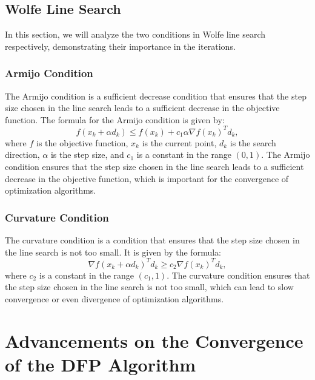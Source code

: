\documentclass[12pt,a4paper,draft]{beamer}  %
\theoremstyle{definition}
\numberwithin{equation}{section}
\begin{document}
\subsection{Wolfe Line Search}
In this section, we will analyze the two conditions in Wolfe line search respectively, demonstrating their importance in the iterations.

\subsubsection{Armijo Condition}
The Armijo condition is a sufficient decrease condition that ensures that the step size chosen in the line search leads to a sufficient decrease in the objective function.
The formula for the Armijo condition is given by:
\[f(x_k + \alpha d_k) \leq f(x_k) + c_1 \alpha \nabla f(x_k)^T d_k,\]
where $f$ is the objective function, $x_k$ is the current point, $d_k$ is the search direction, $\alpha$ is the step size, and $c_1$ is a constant in the range $(0, 1)$.  The Armijo condition ensures that the step size chosen in the line search leads to a sufficient decrease in the objective function, which is important for the convergence of optimization algorithms.   

\subsubsection{Curvature Condition}
The curvature condition is a condition that ensures that the step size chosen in the line search is not too small. 
It is given by the formula:
\[\nabla f(x_k + \alpha d_k)^T d_k \geq c_2 \nabla f(x_k)^T d_k,\]
where $c_2$ is a constant in the range $(c_1, 1)$. The curvature condition ensures that the step size chosen in the line search is not too small, which can lead to slow convergence or even divergence of optimization algorithms.



\section{Advancements on the Convergence of the DFP Algorithm}
\end{document}
